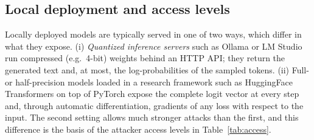 \subsection{Local deployment and access levels}
\label{sec:llm-local}

Locally deployed models are typically served in one of two ways, which differ in what they expose. (i) \emph{Quantized inference servers} such as Ollama or LM Studio run compressed (e.g.\ 4-bit) weights behind an HTTP API; they return the generated text and, at most, the log-probabilities of the sampled tokens. (ii) Full- or half-precision models loaded in a research framework such as HuggingFace Transformers on top of PyTorch expose the complete logit vector at every step and, through automatic differentiation, gradients of any loss with respect to the input. The second setting allows much stronger attacks than the first, and this difference is the basis of the attacker access levels in Table~\ref{tab:access}.
